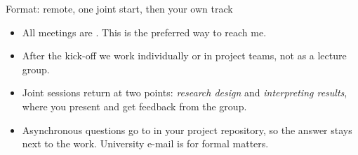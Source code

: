 \documentclass[aspectratio=169,11pt,t]{beamer}
\begin{document}
\begin{frame}{Format: remote, one joint start, then your own track}
  \begin{center}
  \end{center}

  \medskip
  \begin{itemize}
    \item All meetings are . This is the preferred way to reach me.
    \item After the kick-off we work individually or in project teams, not as a lecture group.
    \item Joint sessions return at two points: \emph{research design} and \emph{interpreting results},
          where you present and get feedback from the group.
    \item Asynchronous questions go to  in your project repository, so the
          answer stays next to the work. University e-mail is for formal matters.
  \end{itemize}
\end{frame}
\end{document}
